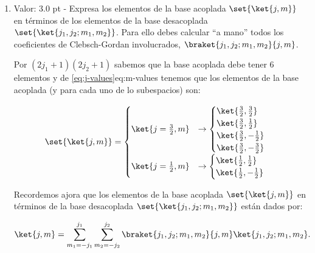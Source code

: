 \documentclass[./../main.tex]{subfiles}
\begin{document}
\begin{exercise}
\begin{enumerate}[label=(\alph*)]
            \item Valor: 3.0 pt - Expresa los elementos de la base acoplada \(\set{\ket{j,m}}\) en términos de los elementos de la base desacoplada \(\set{\ket{j_{1}, j_{2}; m_{1}, m_{2}}}\). Para ello debes calcular ``a mano'' todos los coeficientes de Clebsch-Gordan involucrados, \(\braket{j_{1},j_{2}; m_{1}, m_{2}}{j,m}\).
            
            \begin{solution}
                Por \((2j_{1} + 1)(2j_{2} + 1)\) sabemos que la base acoplada debe tener 6 elementos y de \cref{eq:j-values}{eq:m-values} tenemos que los elementos de la base acoplada (y para cada uno de lo subespacios) son:

                \begin{equation*}
                    \set{\ket{j,m}} = 
                    \begin{cases}
                        \ket{j = \frac{3}{2}, m} &\rightarrow \begin{cases}
                            \ket{\frac{3}{2}, \frac{3}{2}}\\
                            \ket{\frac{3}{2}, \frac{1}{2}}\\
                            \ket{\frac{3}{2}, -\frac{1}{2}}\\
                            \ket{\frac{3}{2}, -\frac{3}{2}}
                        \end{cases}\\
                        \ket{j = \frac{1}{2}, m} &\rightarrow \begin{cases}
                            \ket{\frac{1}{2}, \frac{1}{2}}\\
                            \ket{\frac{1}{2}, -\frac{1}{2}}
                        \end{cases}
                    \end{cases}
                \end{equation*}

                Recordemos ajora que los elementos de la base acoplada \(\set{\ket{j,m}}\) en términos de la base desacoplada \(\set{\ket{j_{1}, j_{2}; m_{1}, m_{2}}}\) están dados por:

                \begin{equation}
                    \ket{j, m} = \sum_{m_{1} = -j_{1}}^{j_{1}}\sum_{m_{2} = -j_{2}}^{j_{2}}\braket{j_{1}, j_{2}; m_{1}, m_{2}}{j, m}\ket{j_{1}, j_{2}; m_{1}, m_{2}}.
                    \label{eq:coupled-base-elements}
                \end{equation}


\end{solution}
\end{enumerate}
\end{exercise}
\end{document}
